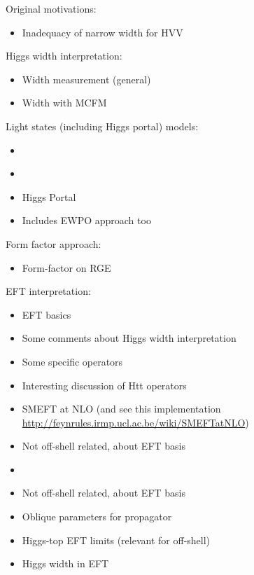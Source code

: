 \documentclass[11pt,letterpaper]{article}
\begin{document}
Original motivations:
\begin{itemize}
  \item \cite{Kauer:2012hd} Inadequacy of narrow width for HVV
\end{itemize}

Higgs width interpretation:
\begin{itemize}  
  \item \cite{Caola:2013yja} Width measurement (general)
  \item \cite{Campbell:2013una} Width with MCFM
\end{itemize}

Light states (including Higgs portal) models:
\begin{itemize}
  \item \cite{Englert:2014aca}
  \item \cite{Englert:2014ffa}
  \item \cite{Goncalves:2017iub} Higgs Portal
  \item \cite{Englert:2020gcp} Includes EWPO approach too
\end{itemize}

Form factor approach:
\begin{itemize}
  \item \cite{Goncalves:2018pkt} Form-factor on RGE
\end{itemize}

EFT interpretation:
\begin{itemize}
  \item \cite{Grzadkowski:2010es} EFT basics
  \item \cite{Azatov:2014jga} Some comments about Higgs width interpretation
  \item \cite{Gainer:2014hha} Some specific operators
  \item \cite{Azatov:2016xik} Interesting discussion of Htt operators
  \item \cite{Passarino:2016pzb} SMEFT at NLO (and see this implementation \url{http://feynrules.irmp.ucl.ac.be/wiki/SMEFTatNLO})
  \item \cite{Falkowski:2015wzab} Not off-shell related, about EFT basis
  \item \cite{Contino:2016jqw}
  \item \cite{Falkowski:2001958} Not off-shell related, about EFT basis
  \item \cite{Englert:2019zmt} Oblique parameters for propagator
  \item \cite{Brivio:2019ius} Higgs-top EFT limits (relevant for off-shell)
  \item \cite{Brivio:2019myy} Higgs width in EFT
\end{itemize}
\end{document}
